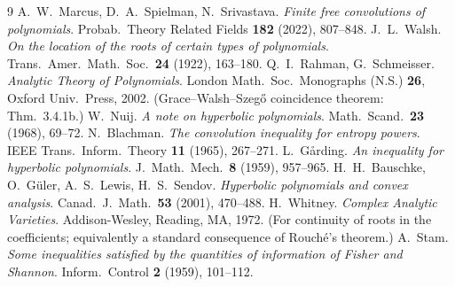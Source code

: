 \begin{thebibliography}{9}
 A.~W.~Marcus, D.~A.~Spielman, N.~Srivastava.
  \emph{Finite free convolutions of polynomials}.
  Probab.\ Theory Related Fields \textbf{182} (2022), 807--848.
 J.~L.~Walsh.
  \emph{On the location of the roots of certain types of polynomials}.
  Trans.\ Amer.\ Math.\ Soc.\ \textbf{24} (1922), 163--180.
 Q.~I.~Rahman, G.~Schmeisser.
  \emph{Analytic Theory of Polynomials}.
  London Math.\ Soc.\ Monographs (N.S.) \textbf{26}, Oxford Univ.\ Press, 2002.
  (Grace--Walsh--Szeg\H{o} coincidence theorem: Thm.~3.4.1b.)
 W.~Nuij.
  \emph{A note on hyperbolic polynomials}.
  Math.\ Scand.\ \textbf{23} (1968), 69--72.
 N.~Blachman.
  \emph{The convolution inequality for entropy powers}.
  IEEE Trans.\ Inform.\ Theory \textbf{11} (1965), 267--271.
 L.~G\aa rding.
  \emph{An inequality for hyperbolic polynomials}.
  J.\ Math.\ Mech.\ \textbf{8} (1959), 957--965.
 H.~H.~Bauschke, O.~G\"uler, A.~S.~Lewis, H.~S.~Sendov.
  \emph{Hyperbolic polynomials and convex analysis}.
  Canad.\ J.\ Math.\ \textbf{53} (2001), 470--488.
 H.~Whitney.
  \emph{Complex Analytic Varieties}.
  Addison-Wesley, Reading, MA, 1972. (For continuity of roots in the
  coefficients; equivalently a standard consequence of Rouch\'e's theorem.)
 A.~Stam.
  \emph{Some inequalities satisfied by the quantities of information of Fisher
  and Shannon}. Inform.\ Control \textbf{2} (1959), 101--112.
\end{thebibliography}

\endgroup